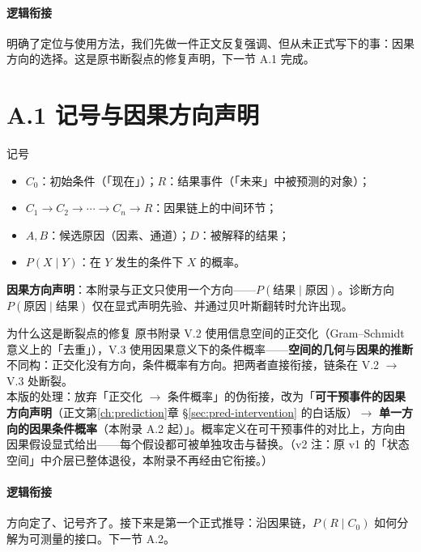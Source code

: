 \documentclass[../../main2.tex]{subfiles}
\begin{document}
	\paragraph*{逻辑衔接}
	明确了定位与使用方法，我们先做一件正文反复强调、但从未正式写下的事：因果方向的选择。这是原书断裂点的修复声明，下一节 A.1 完成。

	\section{A.1 记号与因果方向声明}

	\begin{mathbox}{记号}
		\begin{itemize}
			\item $C_0$：初始条件（「现在」）；$R$：结果事件（「未来」中被预测的对象）；
			\item $C_1 \to C_2 \to \cdots \to C_n \to R$：因果链上的中间环节；
			\item $A, B$：候选原因（因素、通道）；$D$：被解释的结果；
			\item $P(X \mid Y)$：在 $Y$ 发生的条件下 $X$ 的概率。
		\end{itemize}
	\end{mathbox}

	\textbf{因果方向声明}：本附录与正文只使用一个方向——$P(\text{结果} \mid \text{原因})$。诊断方向 $P(\text{原因} \mid \text{结果})$ 仅在显式声明先验、并通过贝叶斯翻转时允许出现。

	\begin{mathbox}{为什么这是断裂点的修复}
		原书附录 V.2 使用信息空间的正交化（Gram--Schmidt 意义上的「去重」），V.3 使用因果意义下的条件概率——\textbf{空间的几何}与\textbf{因果的推断}不同构：正交化没有方向，条件概率有方向。把两者直接衔接，链条在 V.2 $\rightarrow$ V.3 处断裂。\\[0.4em]
		本版的处理：放弃「正交化 $\to$ 条件概率」的伪衔接，改为「\textbf{可干预事件的因果方向声明}（正文第\ref{ch:prediction}章 §\ref{sec:pred-intervention} 的白话版）$\to$ \textbf{单一方向的因果条件概率}（本附录 A.2 起）」。概率定义在可干预事件的对比上，方向由因果假设显式给出——每个假设都可被单独攻击与替换。（v2 注：原 v1 的「状态空间」中介层已整体退役，本附录不再经由它衔接。）
	\end{mathbox}

	\paragraph*{逻辑衔接}
	方向定了、记号齐了。接下来是第一个正式推导：沿因果链，$P(R \mid C_0)$ 如何分解为可测量的接口。下一节 A.2。
\end{document}

